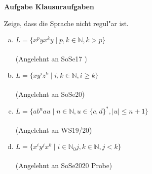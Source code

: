 \documentclass[a4paper,12pt]{article}
\newcommand{\Aufgabe}[1]{
  {
  \vspace*{0.5cm}
  \textsf{\textbf{Aufgabe #1}}
  \vspace*{0.2cm}
  
  }
}
\begin{document}
\Aufgabe{Klausuraufgaben}
Zeige, dass die Sprache nicht regul"ar ist.
\begin{enumerate}[a)]
\item
$L = \{ x^pyx^ky \mid p,k \in \mathbb{N}, k > p     \}$
\\ \\
(Angelehnt an SoSe17 )
\item
$L = \{xy^iz^k \mid i,k \in \mathbb{N}, i \geq k \} $
\\ \\
(Angelehnt an SoSe20)
\item
$L = \{ab^nau \mid n \in \mathbb{N},u\in \{c,d\}^*,  \vert u \vert \leq n + 1 \} $
\\ \\
(Angelehnt an WS19/20)
\item
$L = \{x^iy^jx^k \mid i \in \mathbb{N}_0 j,k \in \mathbb{N}, j<k \} $
\\ \\
(Angelehnt an SoSe2020 Probe)
\end{enumerate}






\end{document}
